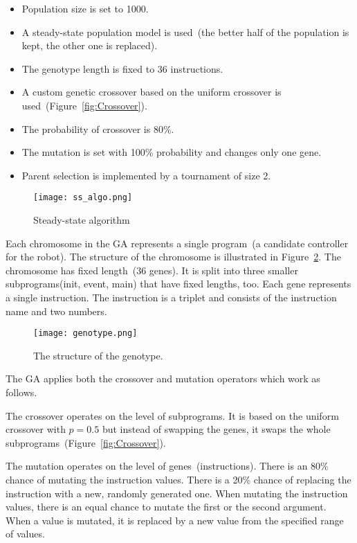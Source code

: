 \documentclass{ExcelAtFIT}
\begin{document}
{\begin{itemize}
	\item Population size is set to 1000.
	\item A steady-state population model is used~(the better half of the population is kept, the other one is replaced).
	\item The genotype length is fixed to 36 instructions.
	\item A custom genetic crossover based on the uniform crossover is used~(Figure~\ref{fig:Crossover}).
	\item The probability of crossover is 80\%.
	\item The mutation is set with 100\% probability and changes only one gene.
	\item Parent selection is implemented by a tournament of size 2.
\end{itemize}

\begin{figure}[h]
	\centering
	{\texttt{[image: ss\_algo.png]}}
	\caption{
	Steady-state algorithm
	}
	\label{fig:SteadyStateAlgorithm}
\end{figure}

Each chromosome in the GA represents a single program~(a candidate controller for the robot).
The structure of the chromosome is illustrated in Figure~\ref{fig:Genotype}.
The chromosome has fixed length~(36 genes).
It is split into three smaller subprograms(init, event, main) that have fixed lengths, too.
Each gene represents a single instruction.
The instruction is a triplet and consists of the instruction name and two numbers.

\begin{figure}[h]
	\centering
	{\texttt{[image: genotype.png]}}
	\caption{
		The structure of the genotype.
	}
	\label{fig:Genotype}
\end{figure}

The GA applies both the crossover and mutation operators which work as follows.

The crossover operates on the level of subprograms.
It is based on the uniform crossover with $p = 0.5$ but instead of swapping the genes, it swaps the whole subprograms~(Figure~\ref{fig:Crossover}).

The mutation operates on the level of genes~(instructions).
There is an 80\% chance of mutating the instruction values.
There is a 20\% chance of replacing the instruction with a new, randomly generated one.
When mutating the instruction values, there is an equal chance to mutate the first or the second argument.
When a value is mutated, it is replaced by a new value from the specified range of values.

}
\end{document}
